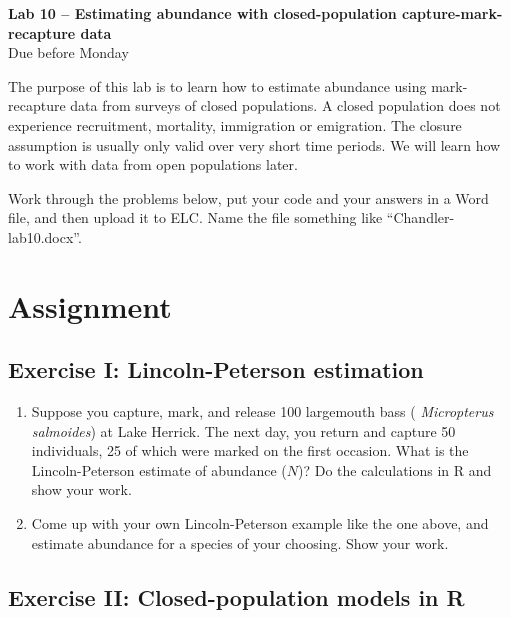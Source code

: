 \documentclass[12pt]{article}\usepackage[]{graphicx}\usepackage[]{color}
\begin{document}
{
  \Large
  \centering
  {\bf Lab 10 -- Estimating abundance with closed-population capture-mark-recapture data \\ }
  Due before Monday \\
}

\vspace{10pt}


The purpose of this lab is to learn how to estimate abundance using
mark-recapture data from surveys of closed populations. A closed
population does not experience recruitment, mortality, immigration or
emigration. The closure assumption is usually only valid over very
short time periods. We will learn how to work with data from open
populations later.

Work through the problems below, put your code and your answers in a
Word file, and then upload it to ELC. Name the file something like 
``Chandler-lab10.docx''.  

\vspace{-6pt}

\section*{Assignment}

\subsection*{Exercise I: Lincoln-Peterson estimation}

\begin{enumerate}
  \item Suppose you capture, mark, and release 100 largemouth bass ({\it
      Micropterus salmoides}) at Lake Herrick. The next day, you return
    and capture 50 individuals, 25 of which were marked on the first
    occasion. What is the Lincoln-Peterson estimate of abundance ($N$)?
    Do the calculations in R and show your work.
  \item Come up with your own Lincoln-Peterson example like the one
    above, and estimate abundance for a species of your choosing.
    Show your work.
\end{enumerate}



\subsection*{Exercise II: Closed-population models in R}
\end{document}
